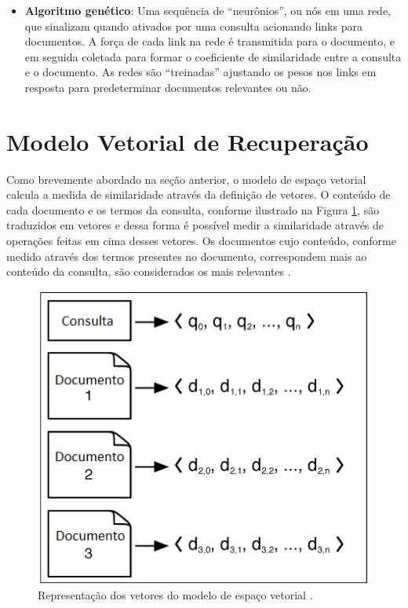 \begin{itemize}
	\item{\textbf{Algoritmo genético}: Uma sequência de “neurônios”, ou nós em uma rede, que sinalizam quando ativados por uma consulta acionando links para documentos. A força de cada link na rede é transmitida para o documento, e em seguida coletada para formar o coeficiente de similaridade entre a consulta e o documento. As redes são “treinadas” ajustando os pesos nos links em resposta para predeterminar documentos relevantes ou não.}

\end{itemize}


\section{Modelo Vetorial de Recuperação}

Como brevemente abordado na seção anterior, o modelo de espaço vetorial calcula a medida de similaridade através da definição de vetores. O conteúdo de cada documento e os termos da consulta, conforme ilustrado na Figura \ref{fig:documento-vetor}, são traduzidos em vetores e dessa forma é possível medir a similaridade através de operações feitas em cima desses vetores. Os documentos cujo conteúdo, conforme medido através dos termos presentes no documento, correspondem mais ao conteúdo da consulta, são considerados os mais relevantes \citep{Grossman2004}.

\begin{figure}[htb]
	\centering
	\includegraphics[scale=1.0]{chapters/informationretrieval/Document_as_Vectors.png}
	\caption{Representação dos vetores do modelo de espaço vetorial \citep{Grossman2004}.}
	\label{fig:documento-vetor}
\end{figure}

